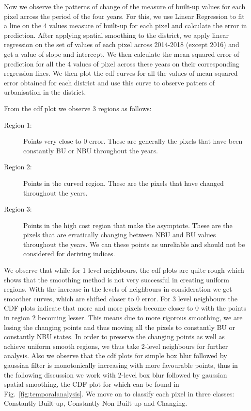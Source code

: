 Now we observe the patterns of change of the measure of built-up values for each pixel across the period of the four years. For this, we use Linear Regression to fit a line on the 4 values measure of built-up for each pixel and calculate the error in prediction. After applying spatial smoothing to the district, we apply linear regression on the set of values of each pixel across 2014-2018 (except 2016) and get a value of slope and intercept. We then calculate the mean squared error of prediction for all the 4 values of pixel across these years on their corresponding regression lines. We then plot the cdf curves for all the values of mean squared error obtained for each district and use this curve to observe patters of urbanisation in the district.

From the cdf plot we observe 3 regions as follows:
\begin{description}
	\item[Region 1:] Points very close to 0 error. These are generally the pixels that have been constantly BU or NBU throughout the years.
	\item[Region 2:] Points in the curved region. These are the pixels that have changed throughout the years.
	\item[Region 3:] Points in the high cost region that make the asymptote. These are the pixels that are erratically changing between NBU and BU values throughout the years. We can these points as unreliable and should not be considered for deriving indices.
\end{description}

We observe that while for 1 level neighbours, the cdf plots are quite rough which shows that the smoothing method is not very successful in creating uniform regions. With the increase in the levels of neighbours in consideration we get smoother curves, which are shifted closer to 0 error. For 3 level neighbours the CDF plots indicate that more and more pixels become closer to 0 with the points in region 2 becoming lesser. This means due to more rigorous smoothing, we are losing the changing points and thus moving all the pixels to constantly BU or constantly NBU states. In order to preserve the changing points as well as achieve uniform smooth regions, we thus take 2-level neighbours for further analysis. Also we observe that the cdf plots for simple box blur followed by gaussian filter is monotonically increasing with more favourable points, thus in the following discussion we work with 2-level box blur followed by gaussian spatial smoothing, the CDF plot for which can be found in Fig.~\ref{fig:temporalanalysis}. We move on to classify each pixel in three classes: Constantly Built-up, Constantly Non Built-up and Changing.

